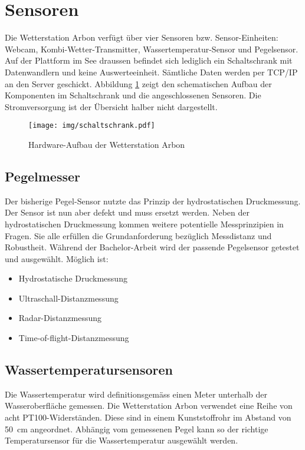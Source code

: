 \section{Sensoren}
Die Wetterstation Arbon verfügt über vier Sensoren bzw. Sensor-Einheiten: Webcam, Kombi-Wetter-Transmitter, Wassertemperatur-Sensor und Pegelsensor. Auf der Plattform im See draussen befindet sich lediglich ein Schaltschrank mit Datenwandlern und keine Auswerteeinheit. Sämtliche Daten werden per TCP/IP an den Server geschickt. Abbildung \ref{img:schaltschrank} zeigt den schematischen Aufbau der Komponenten im Schaltschrank und die angeschlossenen Sensoren. Die Stromversorgung ist der Übersicht halber nicht dargestellt.

\begin{figure}[h]
	\centering
	\texttt{[image: img/schaltschrank.pdf]}
	\caption{Hardware-Aufbau der Wetterstation Arbon}
	\label{img:schaltschrank}
\end{figure}



\subsection{Pegelmesser}
Der bisherige Pegel-Sensor nutzte das Prinzip der hydrostatischen Druckmessung. Der Sensor ist nun aber defekt und muss ersetzt werden. Neben der hydrostatischen Druckmessung kommen weitere potentielle Messprinzipien in Fragen. Sie alle erfüllen die Grundanforderung bezüglich Messdistanz und Robustheit. Während der Bachelor-Arbeit wird der passende Pegelsensor getestet und ausgewählt. Möglich ist:

\begin{itemize}  
\item Hydrostatische Druckmessung
\item Ultraschall-Distanzmessung
\item Radar-Distanzmessung
\item Time-of-flight-Distanzmessung
\end{itemize}

\subsection{Wassertemperatursensoren}
Die Wassertemperatur wird definitionsgemäss einen Meter unterhalb der Wasseroberfläche gemessen. Die Wetterstation Arbon verwendet eine Reihe von acht PT100-Widerständen. Diese sind in einem Kunststoffrohr im Abstand von 50~cm angeordnet. Abhängig vom gemessenen Pegel kann so der richtige Temperatursensor für die Wassertemperatur ausgewählt werden. 
\newline

